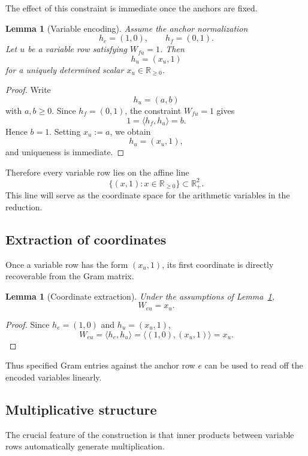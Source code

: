\documentclass[11pt]{article}
\newtheorem{lemma}[theorem]{Lemma}
\begin{document}
The effect of this constraint is immediate once the anchors are fixed.

\begin{lemma}[Variable encoding]
\label{lem:variable-encoding}
Assume the anchor normalization
\[
h_e=(1,0),\qquad h_f=(0,1).
\]
Let $u$ be a variable row satisfying $W_{fu}=1$. Then
\[
h_u=(x_u,1)
\]
for a uniquely determined scalar $x_u\in \mathbb{R}_{\ge 0}$.
\end{lemma}

\begin{proof}
Write
\[
h_u=(a,b)
\]
with $a,b\ge 0$. Since $h_f=(0,1)$, the constraint $W_{fu}=1$ gives
\[
1 = \langle h_f,h_u\rangle = b.
\]
Hence $b=1$. Setting $x_u:=a$, we obtain
\[
h_u=(x_u,1),
\]
and uniqueness is immediate.
\end{proof}

Therefore every variable row lies on the affine line
\[
\{(x,1):x\in\mathbb{R}_{\ge 0}\}\subset \mathbb{R}_+^2.
\]
This line will serve as the coordinate space for the arithmetic variables in
the reduction.

\subsection{Extraction of coordinates}

Once a variable row has the form $(x_u,1)$, its first coordinate is directly
recoverable from the Gram matrix.

\begin{lemma}[Coordinate extraction]
\label{lem:coordinate-extraction}
Under the assumptions of Lemma~\ref{lem:variable-encoding},
\[
W_{eu}=x_u.
\]
\end{lemma}

\begin{proof}
Since $h_e=(1,0)$ and $h_u=(x_u,1)$,
\[
W_{eu}=\langle h_e,h_u\rangle
      =\langle (1,0),(x_u,1)\rangle
      =x_u.
\]
\end{proof}

Thus specified Gram entries against the anchor row $e$ can be used to read off
the encoded variables linearly.

\subsection{Multiplicative structure}

The crucial feature of the construction is that inner products between
variable rows automatically generate multiplication.
\end{document}
